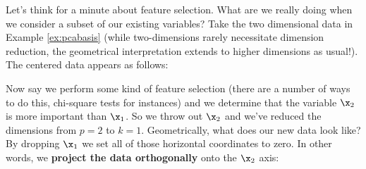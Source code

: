 \documentclass[
]{article}
\theoremstyle{definition}
\theoremstyle{definition}
\theoremstyle{definition}
\theoremstyle{definition}
\theoremstyle{remark}
\begin{document}
Let's think for a minute about feature selection. What are we really doing when we consider a subset of our existing variables? Take the two dimensional data in Example \ref{ex:pcabasis} (while two-dimensions rarely necessitate dimension reduction, the geometrical interpretation extends to higher dimensions as usual!). The centered data appears as follows:

Now say we perform some kind of feature selection (there are a number of ways to do this, chi-square tests for instances) and we determine that the variable \(\x_2\) is more important than \(\x_1\). So we throw out \(\x_2\) and we've reduced the dimensions from \(p=2\) to \(k=1\). Geometrically, what does our new data look like? By dropping \(\x_1\) we set all of those horizontal coordinates to zero. In other words, we \textbf{project the data orthogonally} onto the \(\x_2\) axis:
\end{document}
